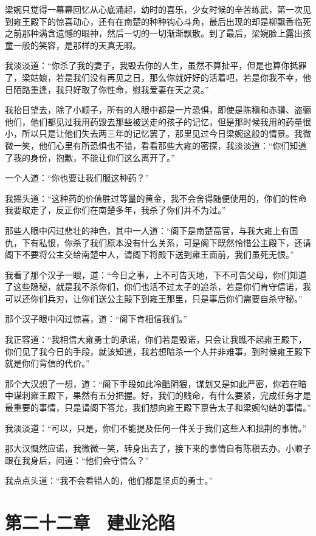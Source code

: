 梁婉只觉得一幕幕回忆从心底涌起，幼时的喜乐，少女时候的辛苦练武，第一次见到雍王殿下的惊喜动心，还有在南楚的种种钩心斗角，最后出现的却是柳飘香临死之前那种满含遗憾的眼神，然后一切的一切渐渐飘散。到了最后，梁婉脸上露出孩童一般的笑容，是那样的天真无暇。

我淡淡道：“你杀了我的妻子，我毁去你的人生，虽然不算扯平，但是也算你抵罪了，梁姑娘，若是我们没有再见之日，那么你就好好的活着吧，若是你我不幸，他日陌路重逢，我只好取了你性命，慰我爱妻在天之灵。”

我抬目望去，除了小顺子，所有的人眼中都是一片恐惧，即使是陈稹和赤骥、盗骊他们，他们都见过我用药毁去那些被送走的孩子的记忆，但是那时候我用的药量很小，所以只是让他们失去两三年的记忆罢了，那里见过今日梁婉这般的情景。我微微一笑，他们心里有所恐惧也不错，看看那些大雍的密探，我淡淡道：“你们知道了我的身份，抱歉，不能让你们这么离开了。”

一个人道：“你也要让我们服这种药？”

我摇头道：“这种药的价值胜过等量的黄金，我不会舍得随便使用的，你们的性命我要取走了，反正你们在南楚多年，我杀了你们并不为过。”

那些人眼中闪过悲壮的神色，其中一人道：“阁下是南楚高官，与我大雍上有国仇，下有私恨，你杀了我们原本没有什么关系，可是阁下既然怜惜公主殿下，还请阁下不要将公主交给南楚中人，请阁下将殿下送到雍王面前，我们虽死无恨。”

我看了那个汉子一眼，道：“今日之事，上不可告天地，下不可告父母，你们知道了这些隐秘，就是我不杀你们，你们也活不过太子的追杀，若是你们肯守信诺，我可以还你们兵刃，让你们送公主殿下到雍王那里，只是事后你们需要自杀守秘。”

那个汉子眼中闪过惊喜，道：“阁下肯相信我们。”

我正容道：“我相信大雍勇士的承诺，你们若是毁诺，只会让我瞧不起雍王殿下，你们见了我今日的手段，就该知道，我若想暗杀一个人并非难事，到时候雍王殿下就是你们背信的代价。”

那个大汉想了一想，道：“阁下手段如此冷酷阴狠，谋划又是如此严密，你若在暗中谋刺雍王殿下，果然有五分把握。好，我们的贱命，有什么要紧，完成任务才是最重要的事情，只是请阁下答允，我们想向雍王殿下禀告太子和梁婉勾结的事情。”

我淡淡道：“可以，只是，你们不能提及任何一件关于我们这些人和拙荆的事情。”

那大汉慨然应诺，我微微一笑，转身出去了，接下来的事情自有陈稹去办。小顺子跟在我身后，问道：“他们会守信么？”

我点点头道：“我不会看错人的，他们都是坚贞的勇士。”

\chapter{第二十二章　建业沦陷}

